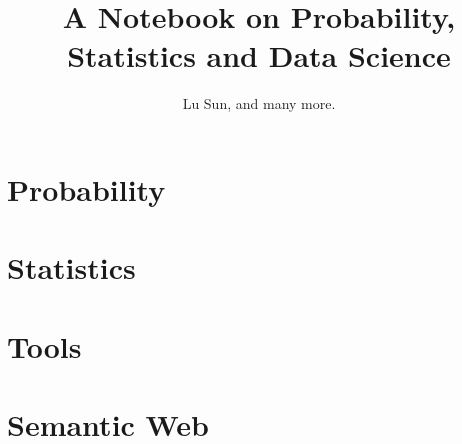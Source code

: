 


\makeindex



\frontmatter

\title{A Notebook on Probability, Statistics and Data Science}
\author{Lu Sun, and many more.}

\maketitle


\tableofcontents


\listoffigures
\listoftables

\mainmatter

\part{Probability}







\part{Statistics}







\part{Tools}









\part{Semantic Web}












\appendix





\printindex


